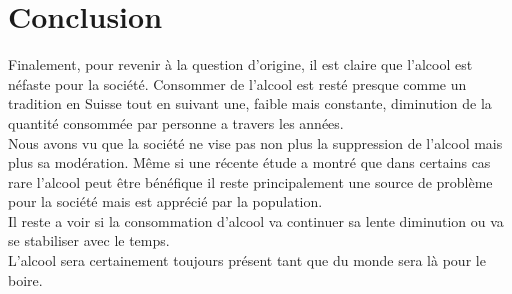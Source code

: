 \documentclass[a4paper, french, 12pt]{extarticle}
\begin{document}
  \section{Conclusion}
  Finalement, pour revenir à la question d'origine, il est claire que l'alcool est néfaste pour la société. Consommer de l'alcool est resté presque comme un tradition en Suisse tout en suivant une, faible mais constante, diminution de la quantité consommée par personne a travers les années.\\
  Nous avons vu que la société ne vise pas non plus la suppression de l'alcool mais plus sa modération. Même si une récente étude a montré que dans certains cas rare l'alcool peut être bénéfique il reste principalement une source de problème pour la société mais est apprécié par la population.\\
  Il reste a voir si la consommation d'alcool va continuer sa lente diminution ou va se stabiliser avec le temps.\\
  L'alcool sera certainement toujours présent tant que du monde sera là pour le boire.   
			  
			
	\pagebreak
	      
	\tableofcontents
	
\end{document}
